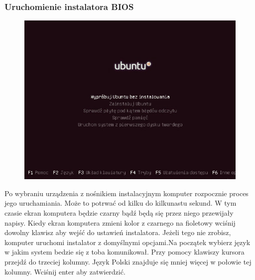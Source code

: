 \subsubsection{Uruchomienie instalatora BIOS}
\begin{figure}
		\includegraphics[scale=0.5]{images/instalacja_BIOS_boot.png}
\end{figure}
Po wybraniu urządzenia z nośnikiem instalacyjnym komputer rozpocznie proces jego uruchamiania. Może to potrwać od kilku do kilkunastu sekund. W tym czasie ekran komputera będzie czarny bądź będą się przez niego przewijały napisy. Kiedy ekran komputera zmieni kolor z czarnego na fioletowy wciśnij dowolny klawisz aby wejść do ustawień instalatora. Jeżeli tego nie zrobisz, komputer uruchomi instalator z domyślnymi opcjami.Na początek wybierz język w jakim system bedzie się z toba komunikował. Przy pomocy klawiszy kursora przejdź do trzeciej kolumny. Język Polski  znajduje się mniej więcej w połowie tej kolumny. Wciśnij enter aby zatwierdzić.
\clearpage
